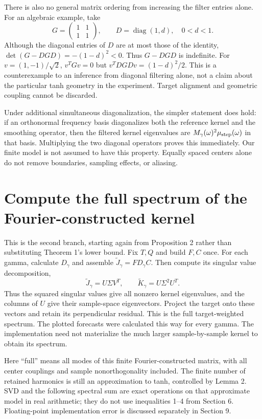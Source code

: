 \documentclass[11pt]{article}
\DeclareMathOperator{\diag}{diag}
\theoremstyle{definition}
\begin{document}
There is also no general matrix ordering from increasing the filter entries
alone. For an algebraic example, take
\begin{equation*}
 G=\begin{pmatrix}1&1\\1&1\end{pmatrix},\qquad
 D=\diag(1,d),\quad 0<d<1.
\end{equation*}
Although the diagonal entries of $D$ are at most those of the identity,
$\det(G-DGD)=-(1-d)^2<0$. Thus $G-DGD$ is indefinite. For
$v=(1,-1)/\sqrt2$, $v^TGv=0$ but $v^TDGDv=(1-d)^2/2$.
This is a counterexample to an inference from diagonal filtering alone, not
a claim about the particular tanh geometry in the experiment. Target
alignment and geometric coupling cannot be discarded.

Under additional simultaneous diagonalization, the simpler statement does
hold: if an orthonormal frequency basis diagonalizes both the reference
kernel and the smoothing operator, then the filtered kernel eigenvalues are
$M_\gamma(\omega)^2\mu_{\rm step}(\omega)$ in that basis. Multiplying the
two diagonal operators proves this immediately. Our finite model is not
assumed to have this property. Equally spaced centers alone do not remove
boundaries, sampling effects, or aliasing.

\section{Compute the full spectrum of the Fourier-constructed kernel}
This is the second branch, starting again from Proposition 2 rather than
substituting Theorem 1's lower bound. Fix $T,Q$ and build $F,C$ once. For each
gamma, calculate $D_\gamma$ and assemble $\widetilde J_\gamma=FD_\gamma C$.
Then compute its singular value decomposition,
\begin{equation*}
 \widetilde J_\gamma=U\Sigma V^T,\qquad
 \widetilde K_\gamma=U\Sigma^2U^T.
\end{equation*}
Thus the squared singular values give all nonzero kernel eigenvalues, and the
columns of $U$ give their sample-space eigenvectors. Project the target onto
these vectors and retain its perpendicular residual. This is the full
target-weighted spectrum. The plotted forecasts were calculated this way for
every gamma. The implementation need not materialize the much larger
sample-by-sample kernel to obtain its spectrum.

Here ``full'' means all modes of this finite Fourier-constructed matrix, with
all center couplings and sample nonorthogonality included. The finite number
of retained harmonics is still an approximation to tanh, controlled by Lemma 2.
SVD and the following spectral sum are exact operations on that approximate
model in real arithmetic; they do not use inequalities 1--4 from Section 6.
Floating-point implementation error is discussed separately in Section 9.
\end{document}
